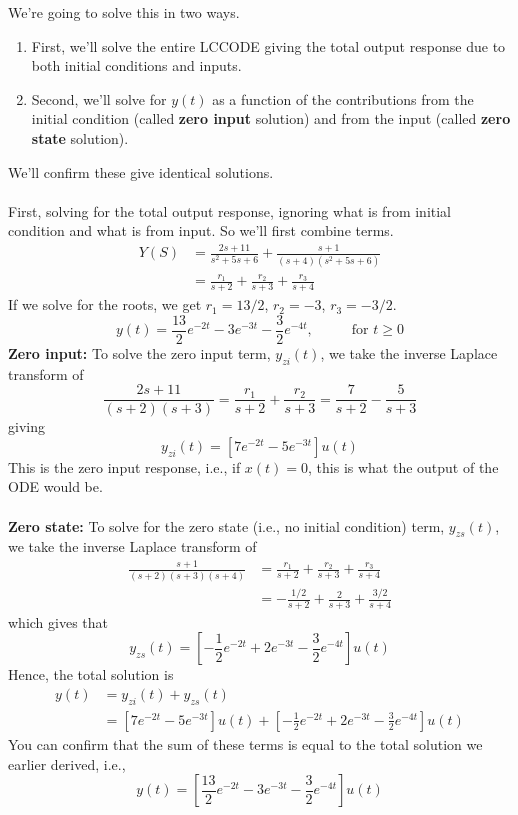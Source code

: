 \documentclass[10pt]{article}
\begin{document}
We're going to solve this in two ways.
\begin{enumerate}
    \item First, we'll solve the entire LCCODE giving the total output response due to both initial conditions and inputs.
    \item Second, we'll solve for $y(t)$ as a function of the contributions from the initial condition (called \textbf{zero input} solution) and from the input (called \textbf{zero state} solution).
\end{enumerate}
We'll confirm these give identical solutions.\\\\
First, solving for the total output response, ignoring what is from initial condition and what is from input.  So we'll first combine terms.
\begin{align*}
    Y(S) &= \frac{2s + 11}{s^2 + 5s + 6} + \frac{s + 1}{(s + 4)(s^2 + 5s + 6)}\\
    &= \frac{r_1}{s + 2} + \frac{r_2}{s + 3} + \frac{r_3}{s + 4}
\end{align*}
If we solve for the roots, we get $r_1 = 13/2$, $r_2 = -3$, $r_3 = -3/2$.
\[y(t) = \frac{13}{2}e^{-2t} - 3e^{-3t} - \frac{3}{2} e^{-4t}, \hspace{1cm}\text{ for $t \geq 0$}\]
\textbf{Zero input:} To solve the zero input term, $y_{zi}(t)$, we take the inverse Laplace transform of
\[\frac{2s + 11}{(s + 2)(s + 3)} = \frac{r_1}{s + 2} + \frac{r_2}{s + 3} = \frac{7}{s + 2} - \frac{5}{s + 3}\]
giving
\[y_{zi}(t) = [7e^{-2t} - 5e^{-3t}]u(t)\]
This is the zero input response, i.e., if $x(t) = 0$, this is what the output of the ODE would be.\\\\
\textbf{Zero state:} To solve for the zero state (i.e., no initial condition) term, $y_{zs}(t)$, we take the inverse Laplace transform of
\begin{align*}
    \frac{s + 1}{(s + 2)(s + 3)(s + 4)} &= \frac{r_1}{s + 2} + \frac{r_2}{s + 3} + \frac{r_3}{s + 4}\\    
    &= -\frac{1/2}{s + 2} + \frac{2}{s + 3} + \frac{3/2}{s + 4}
\end{align*}
which gives that
\[y_{zs}(t) = \left[-\frac{1}{2} e^{-2t} + 2e^{-3t} - \frac{3}{2} e^{-4t}\right]u(t)\]
Hence, the total solution is
\begin{align*}
    y(t) &= y_{zi}(t) + y_{zs}(t)\\
    &= [7e^{-2t} - 5e^{-3t}]u(t) + \left[-\frac{1}{2} e^{-2t} + 2e^{-3t} - \frac{3}{2} e^{-4t}\right]u(t)
\end{align*}
You can confirm that the sum of these terms is equal to the total solution we earlier derived, i.e., 
\[y(t) = \left[\frac{13}{2}e^{-2t} - 3e^{-3t} - \frac{3}{2}e^{-4t}\right]u(t)\]
\end{document}

